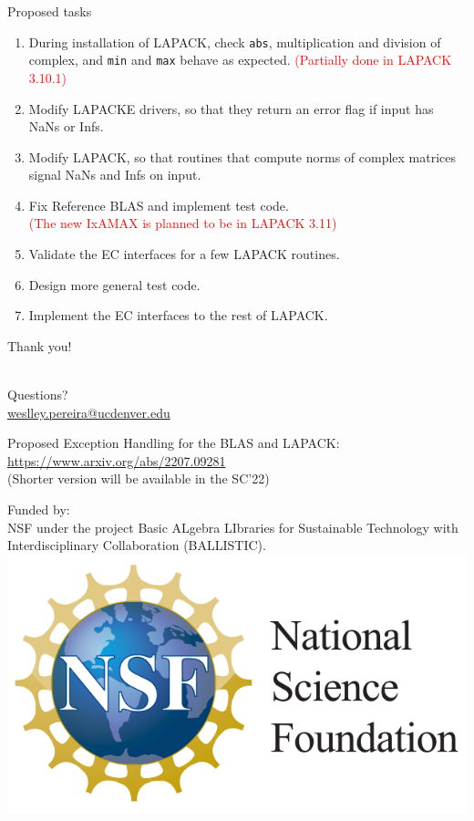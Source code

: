 \documentclass[11pt]{beamer}
\begin{document}
\begin{frame}{Proposed tasks}

	\begin{enumerate}
		\setlength\itemsep{0.7em}
		\item During installation of LAPACK, check \texttt{abs}, multiplication and division of complex, and \texttt{min} and \texttt{max} behave as expected. \textcolor{red}{\small (Partially done in LAPACK 3.10.1)}
		\item Modify LAPACKE drivers, so that they return an error flag if input has NaNs or Infs.
		\item Modify LAPACK, so that routines that compute norms of complex matrices signal NaNs and Infs on input.
		\item Fix Reference BLAS and implement test code.\\
		\textcolor{red}{\small (The new IxAMAX is planned to be in LAPACK 3.11)}
		\item Validate the EC interfaces for a few LAPACK routines.
		\item Design more general test code.
		\item Implement the EC interfaces to the rest of LAPACK.
	\end{enumerate}

\end{frame}

\begin{frame}

\vspace{20pt}
\begin{center}
	{\LARGE Thank you!}
	
	~\\
	{\Large Questions?}
	\\
	\href{mailto:weslley.pereira@ucdenver.edu}{weslley.pereira@ucdenver.edu}
\end{center}

\vspace{10pt}
\begin{center}
	\small
Proposed Exception Handling
for the BLAS and LAPACK:\\ \url{https://www.arxiv.org/abs/2207.09281}\\
(Shorter version will be available in the SC'22)
\end{center}

\vspace{10pt}
\begin{center}
	\small
Funded by:\\
NSF under the project
Basic ALgebra LIbraries for Sustainable
Technology with Interdisciplinary Collaboration
(BALLISTIC).\\
\includegraphics[height=.15\linewidth]{img/NSF}
\end{center}

\end{frame}
\end{document}
